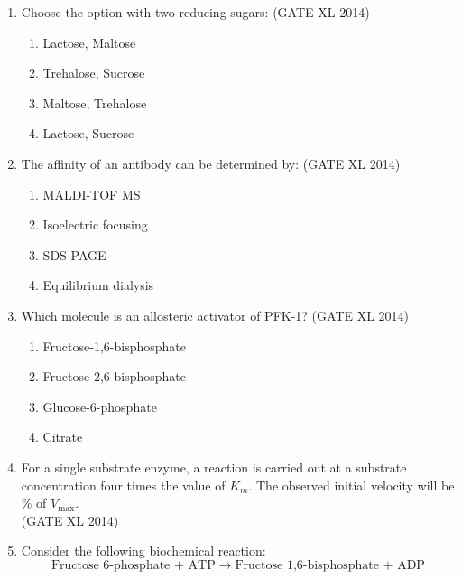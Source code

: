 \documentclass[journal,12pt,onecolumn]{IEEEtran}
\theoremstyle{remark}
\begin{document}
\begin{enumerate}
  \item Choose the option with two reducing sugars: 
  \hfill (GATE XL 2014)\\
  \begin{multicols}{2}
  \begin{enumerate}
    \item Lactose, Maltose
    \item Trehalose, Sucrose
    \item Maltose, Trehalose
    \item Lactose, Sucrose
  \end{enumerate}
  \end{multicols}

  \item The affinity of an antibody can be determined by: 
  \hfill (GATE XL 2014)\\
  \begin{multicols}{2}
  \begin{enumerate}
    \item MALDI-TOF MS
    \item Isoelectric focusing
    \item SDS-PAGE
    \item Equilibrium dialysis
  \end{enumerate}
  \end{multicols}

  \item Which molecule is an allosteric activator of PFK-1? 
  \hfill (GATE XL 2014)\\
  \begin{multicols}{2}
  \begin{enumerate}
    \item Fructose-1,6-bisphosphate
    \item Fructose-2,6-bisphosphate
    \item Glucose-6-phosphate
    \item Citrate
  \end{enumerate}
  \end{multicols}

   \item For a single substrate enzyme, a reaction is carried out at a substrate concentration four times the value of $K_{m}$. The observed initial velocity will be \underline{\hspace{2cm}} \% of $V_{\max}$.\\
   \hfill (GATE XL 2014)\\
   
   \item Consider the following biochemical reaction:  
    \[
    \text{Fructose 6-phosphate + ATP} \;\longrightarrow\; \text{Fructose 1,6-bisphosphate + ADP}
    \]  


\end{enumerate}
\end{document}
